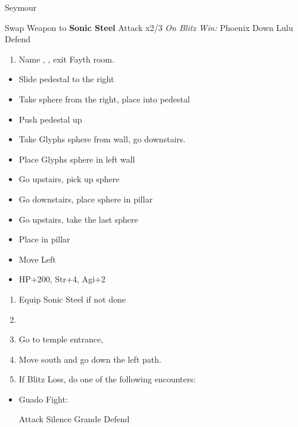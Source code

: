 \begin{battle}[6000]{Seymour}
\begin{itemize}
	\tidusf Swap Weapon to \textbf{Sonic Steel}
	\tidusf Attack x2/3
	\rikkuf \textit{On Blitz Win:} Phoenix Down Lulu
	\rikkuf Defend
\end{itemize}
\end{battle}
\begin{enumerate}[resume]
	\item Name \shiva, \save, exit Fayth room.
\end{enumerate}
\begin{trial}
\begin{itemize}
	\item Slide pedestal to the right
	\item Take sphere from the right, place into pedestal
	\item Push pedestal up
	\item Take Glyphs sphere from wall, go downstairs.
	\item Place Glyphs sphere in left wall
	\item Go upstairs, pick up sphere
	\item Go downstairs, place sphere in pillar
	\item Go upstairs, take the last sphere
	\item Place in pillar
\end{itemize}
\end{trial}
\begin{spheregrid}
\begin{itemize}
	\tidusf
	\begin{itemize}
		\item Move Left
		\item HP+200, Str+4, Agi+2
	\end{itemize}
\end{itemize}
\end{spheregrid}
\begin{enumerate}[resume]
	\item Equip Sonic Steel if not done
	\item \formation{\tidus}{\rikku}{\yuna}
	\item Go to temple entrance, \sd
	\item Move south and go down the left path.
	\item If Blitz Loss, do one of the following encounters:
\end{enumerate}
\begin{encounters}
\begin{itemize}
	\item Guado Fight:
	\begin{itemize}
		\tidusf Attack
		\rikkuf Silence Grande
		\yunaf Defend
	\end{itemize}
\end{itemize}
\end{encounters}
